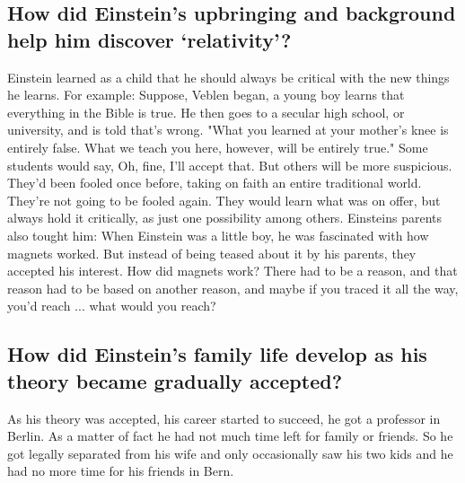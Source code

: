 \subsection*{How did Einstein’s upbringing and background help him discover ‘relativity’?}
Einstein learned as a child that he should always be critical with the new things he learns. For example: Suppose, Veblen began, a young boy learns that everything in the Bible is true. He then goes to a secular high school, or university, and is told that's wrong. "What you learned at your mother's knee is entirely false. What we teach you here, however, will be entirely true." Some students would say, Oh, fine, I'll accept that. But others will be more suspicious. They'd been fooled once before, taking on faith an entire traditional world. They're not going to be fooled again. They would learn what was on offer, but always hold it critically, as just one possibility among others. Einsteins parents also tought him: When Einstein was a little boy, he was fascinated with how magnets worked. But instead of being teased about it by his parents, they accepted his interest. How did magnets work? There had to be a reason, and that reason had to be based on another reason, and maybe if you traced it all the way, you'd reach ... what would you reach?

\subsection*{How did Einstein’s family life develop as his theory became gradually accepted?}
As his theory was accepted, his career started to succeed, he got a professor in Berlin. As a matter of fact he had not much time left for family or friends. So he got legally separated from his wife and only occasionally saw his two kids and he had no more time for his friends in Bern.
